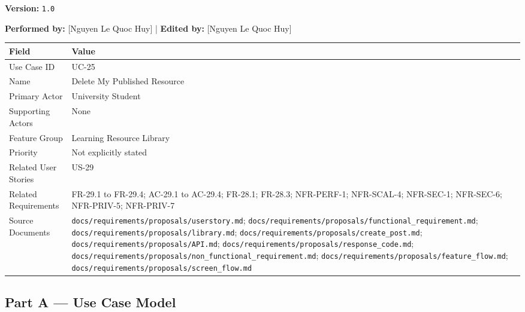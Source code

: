 \documentclass[12pt]{article}
\renewcommand{\baselinestretch}{1.5}
\begin{document}
\textbf{Version:} \texttt{1.0}
\par\medskip

\textbf{Performed by:} [Nguyen Le Quoc Huy] | \textbf{Edited by:} [Nguyen Le Quoc Huy]
\par\medskip

\begingroup
\small
\renewcommand{\baselinestretch}{1.0}\selectfont
\renewcommand{\arraystretch}{1.15}
\setlength{\tabcolsep}{6pt}
\begin{longtable}{|>{\raggedright\arraybackslash}p{}|>{\raggedright\arraybackslash}p{}|}
\hline
\textbf{Field} & \textbf{Value} \\ \hline
\endhead
Use Case ID & UC-25 \\ \hline
Name & Delete My Published Resource \\ \hline
Primary Actor & University Student \\ \hline
Supporting Actors & None \\ \hline
Feature Group & Learning Resource Library \\ \hline
Priority & Not explicitly stated \\ \hline
Related User Stories & US-29 \\ \hline
Related Requirements & FR-29.1 to FR-29.4; AC-29.1 to AC-29.4; FR-28.1; FR-28.3; NFR-PERF-1; NFR-SCAL-4; NFR-SEC-1; NFR-SEC-6; NFR-PRIV-5; NFR-PRIV-7 \\ \hline
Source Documents & \texttt{docs/requirements/proposals/userstory.md}; \texttt{docs/requirements/proposals/functional\_requirement.md}; \texttt{docs/requirements/proposals/library.md}; \texttt{docs/requirements/proposals/create\_post.md}; \texttt{docs/requirements/proposals/API.md}; \texttt{docs/requirements/proposals/response\_code.md}; \texttt{docs/requirements/proposals/non\_functional\_requirement.md}; \texttt{docs/requirements/proposals/feature\_flow.md}; \texttt{docs/requirements/proposals/screen\_flow.md} \\ \hline
\end{longtable}
\endgroup
\par\medskip

\hypertarget{sec:part-a-use-case-model}{}
\subsection*{Part A --- Use Case Model}
\par\medskip

\hypertarget{sec:a1-focused-use-case-diagram}{}
\end{document}
